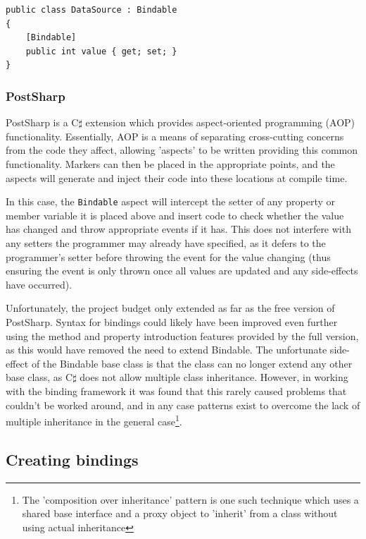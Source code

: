 \documentclass[12pt,twoside,notitlepage]{report}
\begin{document}
\begin{lstlisting}[language={[Sharp]C}, caption={Creating a bindable source class}, label=lst:bindable_source_class]
public class DataSource : Bindable
{
	[Bindable]
	public int value { get; set; }
}
\end{lstlisting}

\subsubsection*{PostSharp}

PostSharp is a C$\sharp$ extension which provides aspect-oriented programming (AOP) functionality. Essentially, AOP is a means of separating cross-cutting concerns from the code they affect, allowing 'aspects' to be written providing this common functionality. Markers can then be placed in the appropriate points, and the aspects will generate and inject their code into these locations at compile time.

In this case, the \texttt{Bindable} aspect will intercept the setter of any property or member variable it is placed above and insert code to check whether the value has changed and throw appropriate events if it has. This does not interfere with any setters the programmer may already have specified, as it defers to the programmer's setter before throwing the event for the value changing (thus ensuring the event is only thrown once all values are updated and any side-effects have occurred).

Unfortunately, the project budget only extended as far as the free version of PostSharp. Syntax for bindings could likely have been improved even further using the method and property introduction features provided by the full version, as this would have removed the need to extend Bindable. The unfortunate side-effect of the Bindable base class is that the class can no longer extend any other base class, as C$\sharp$ does not allow multiple class inheritance. However, in working with the binding framework it was found that this rarely caused problems that couldn't be worked around, and in any case patterns exist to overcome the lack of multiple inheritance in the general case\footnote{The 'composition over inheritance' pattern is one such technique which uses a shared base interface and a proxy object to 'inherit' from a class without using actual inheritance}.

\subsection{Creating bindings}
\end{document}
